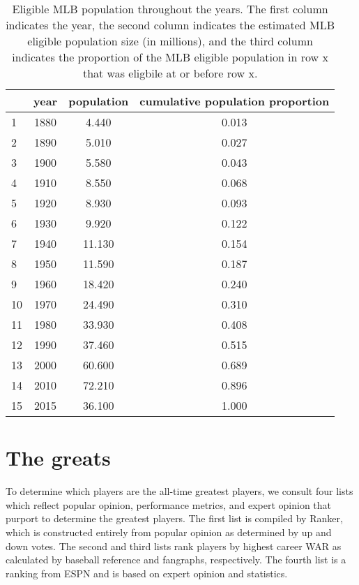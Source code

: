 \documentclass[11pt]{article}\usepackage[]{graphicx}\usepackage[]{color}
\begin{document}
\begin{table}[ht]
\centering
\begin{tabular}{lccc}
  \hline
 & year & population & cumulative population proportion \\ 
  \hline
1 & 1880 & 4.440 & 0.013 \\ 
  2 & 1890 & 5.010 & 0.027 \\ 
  3 & 1900 & 5.580 & 0.043 \\ 
  4 & 1910 & 8.550 & 0.068 \\ 
  5 & 1920 & 8.930 & 0.093 \\ 
  6 & 1930 & 9.920 & 0.122 \\ 
  7 & 1940 & 11.130 & 0.154 \\ 
  8 & 1950 & 11.590 & 0.187 \\ 
  9 & 1960 & 18.420 & 0.240 \\ 
  10 & 1970 & 24.490 & 0.310 \\ 
  11 & 1980 & 33.930 & 0.408 \\ 
  12 & 1990 & 37.460 & 0.515 \\ 
  13 & 2000 & 60.600 & 0.689 \\ 
  14 & 2010 & 72.210 & 0.896 \\ 
  15 & 2015 & 36.100 & 1.000 \\ 
   \hline
\end{tabular}
\caption{Eligible MLB population throughout the years. The first 
    column indicates the year, the second column indicates the 
    estimated MLB eligible population size (in millions), and the 
    third column indicates the proportion of the MLB eligible  
    population in row x that was eligbile at or before row x.} 
\end{table}




\section{The greats}

To determine which players are the all-time greatest players, we consult four 
lists which reflect popular opinion, performance metrics, and expert opinion 
that purport to determine the greatest players.  The first 
list is compiled by Ranker, %
which is constructed entirely from popular opinion as determined by up and 
down votes.  
The second and third lists rank players by highest career WAR as calculated 
by baseball reference and fangraphs, respectively. 
The fourth list is a ranking from ESPN %
and is based on expert opinion and statistics. %
\end{document}
